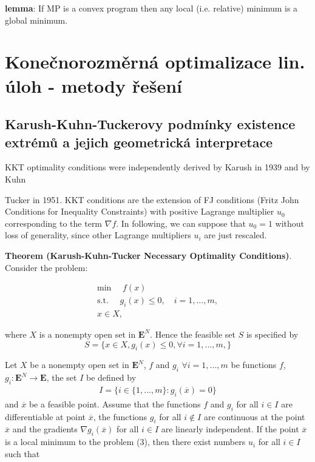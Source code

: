 \documentclass[a4]{report}
\theoremstyle{definition}
\begin{document}
\textbf{lemma}: If MP is a convex program then any local (i.e. relative)
minimum is a global minimum.

\section{Konečnorozměrná optimalizace lin. úloh - metody řešení}

\subsection{Karush-Kuhn-Tuckerovy podmínky existence extrémů a jejich geometrická interpretace}

KKT optimality conditions were independently derived by Karush in 1939 and by Kuhn{Tucker in 1951.
\newline
KKT conditions are the extension of FJ conditions (Fritz John Conditions for Inequality Constraints) with positive
Lagrange multiplier $u_{0}$ corresponding to the term $\nabla f$. In following, we can suppose that
$u_{0} = 1$ without loss of generality, since other Lagrange multipliers $u_{i}$ are just rescaled.
\bigskip

\textbf{Theorem (Karush-Kuhn-Tucker Necessary Optimality Conditions)}. \newline
Consider the problem: 

\begin{align*}
\mbox{min } \quad  f(x)\\
\mbox{s.t. } \quad g_{i}(x) \leq 0, \quad i = 1, ..., m,\\
x \in X,
\end{align*}

where $X$ is a nonempty open set in $\mathbf{E}^{N}$. Hence the feasible set $S$ is specified by 
$$S = \{x \in X, g_{i}(x) \leq 0, \forall i = 1, ..., m,\} $$

Let $X$ be a nonempty open set in $\mathbf{E}^{N}$, $f$ and $g_{i}$ $\forall i = 1, ..., m$ be
functions $f$, $g_{i}: \mathbf{E}^{N} \rightarrow \mathbf{E}$, the set $I$ be defined by 
\begin{align*}
I = \{i \in \{1,...,m\}:g_i(\overline{x})=0\}
\end{align*}
and $\overline{x}$ be a feasible point. Assume
that the functions $f$ and $g_{i}$ for all $i \in I$ are differentiable at point $\overline{x}$, the functions $g_{i}$ for
all $i \notin I$ are continuous at the point $\overline{x}$ and the gradients $\nabla g_{i}(\overline{x})$ for all $i \in I$ are linearly independent. If the point $\overline{x}$ is a local minimum to the problem (3), then there exist
numbers $u_{i}$ for all $i \in I$ such that

}
\end{document}
